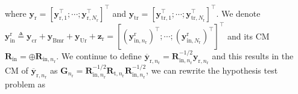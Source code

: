 \documentclass[9pt,journal]{IEEEtran}
\newcommand{\paren}[1]{\left({#1}\right)}
\newcommand{\bracket}[1]{{\left [{#1}\right ]}}
\newcommand{\rr}{_\mathrm{r}}
\newcommand{\sfrac}[2]{#1/#2}
\begin{document}

where $\mathbf{y}_{\mathrm{r}}=\bracket{\mathbf{y}^\top_{\textrm{r},1};\cdots;\mathbf{y}^\top_{\textrm{r},\mathit{N}\rr}}^\top$ and $\mathbf{y}_{\textrm{tr}}=\bracket{\mathbf{y}^\top_{\textrm{tr},1};\cdots;\mathbf{y}^\top_{\textrm{tr},\mathit{N}\rr}}^\top$. We denote $\mathbf{y}^\textrm{r}_{\textrm{in}}\triangleq\mathbf{y}_{\textrm{cr}}+\mathbf{y}_{\textrm{Bmr}}+\mathbf{y}_{\textrm{Ur}}+\mathbf{z}_{\textrm{r}}=\bracket{\paren{\mathbf{y}^{\textrm{r}}_{\textrm{in},n\rr}}^\top;\cdots;\paren{\mathbf{y}^{\textrm{r}}_{\textrm{in},\mathit{N}\rr}}^\top}^\top$ and its CM $\mathbf{R}_{\textrm{in}}=\oplus\mathbf{R}_{\textrm{in},n\rr}$. We continue to define $\overline{\mathbf{y}}_{\textrm{r},n\rr} = \mathbf{R}^{-\sfrac{1}{2}}_{\textrm{in},n\rr}\mathbf{y}_{\textrm{r},n\rr}$ and this results in the CM of $\overline{\mathbf{y}}_{\textrm{r},n\rr}$ as $\mathbf{G}_{n\rr}=\mathbf{R}^{-\sfrac{1}{2}}_{\textrm{in},n\rr}\mathbf{R}_{\textrm{t},n\rr}\mathbf{R}^{-\sfrac{1}{2}}_{\textrm{in},n\rr}$, we can rewrite the hypothesis test problem as  \par\noindent\small
\end{document}
